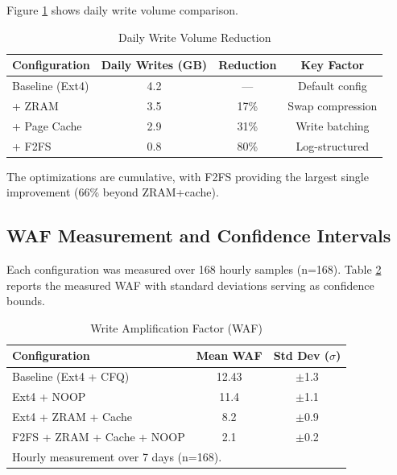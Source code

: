 \documentclass[conference]{IEEEtran}
\begin{document}
Figure \ref{fig:writes} shows daily write volume comparison.

\begin{table}[h]
\caption{Daily Write Volume Reduction}
\begin{center}
\begin{tabular}{lccc}
\toprule
\textbf{Configuration} & \textbf{Daily Writes (GB)} & \textbf{Reduction} & \textbf{Key Factor} \\
\midrule
Baseline (Ext4) & 4.2 & --- & Default config \\
+ ZRAM & 3.5 & 17\% & Swap compression \\
+ Page Cache & 2.9 & 31\% & Write batching \\
+ F2FS & 0.8 & 80\% & Log-structured \\
\bottomrule
\end{tabular}
\end{center}
\label{fig:writes}
\end{table}

The optimizations are cumulative, with F2FS providing the largest single improvement (66\% beyond ZRAM+cache).

\subsection{WAF Measurement and Confidence Intervals}

Each configuration was measured over 168 hourly samples (n=168). Table \ref{tab:waf} reports the measured WAF with standard deviations serving as confidence bounds.

\begin{table}[h]
\caption{Write Amplification Factor (WAF)}
\begin{center}
\begin{tabular}{lcc}
\toprule
\textbf{Configuration} & \textbf{Mean WAF} & \textbf{Std Dev ($\sigma$)} \\
\midrule
Baseline (Ext4 + CFQ) & 12.43 & $\pm$1.3 \\
Ext4 + NOOP & 11.4 & $\pm$1.1 \\
Ext4 + ZRAM + Cache & 8.2 & $\pm$0.9 \\
F2FS + ZRAM + Cache + NOOP & 2.1 & $\pm$0.2 \\
\bottomrule
\multicolumn{3}{l}{\scriptsize Hourly measurement over 7 days (n=168).}
\end{tabular}
\end{center}
\label{tab:waf}
\end{table}
\end{document}
